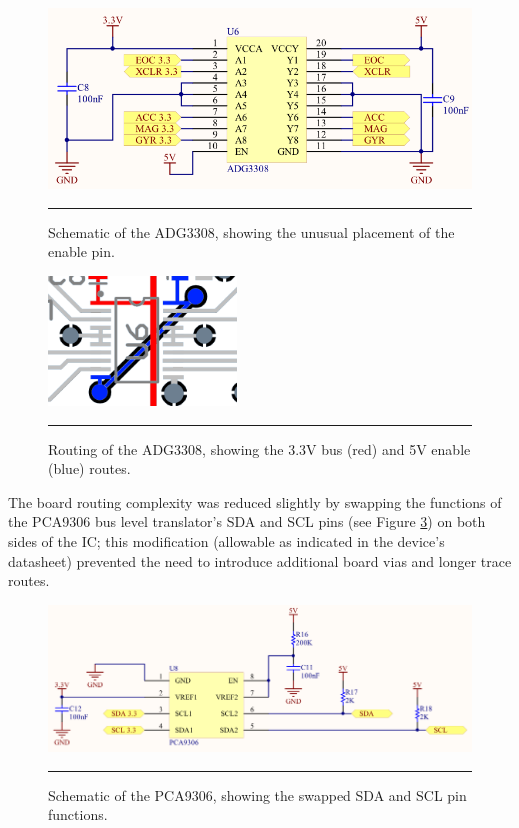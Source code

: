 \begin{figure}[tbph]
	\centering
		\includegraphics[width=120mm]{./Figures/LevelTranslatorSchematic.png}
	\rule{35em}{0.5pt}
	\caption[Bidirectional Level Translator Schematic]{Schematic of the ADG3308, showing the unusual placement of the enable pin.}
	\label{fig:ADG3308schematic}
\end{figure}

\begin{figure}[tbph]
	\centering
		\includegraphics[width=50mm]{./Figures/LevelConverterRouting.png}
	\rule{35em}{0.5pt}
	\caption[Bidirectional Level Translator Routing]{Routing of the ADG3308, showing the 3.3V bus (red) and 5V enable (blue) routes.}
	\label{fig:ADG3308routing}
\end{figure}

The board routing complexity was reduced slightly by swapping the functions of the PCA9306 bus level translator's SDA and SCL pins (see Figure \ref{fig:PCA9306schematic}) on both sides of the IC; this modification (allowable as indicated in the device's datasheet) prevented the need to introduce additional board vias and longer trace routes.

\begin{figure}[tbph]
	\centering
		\includegraphics[width=150mm]{./Figures/I2CTranslatorSchematic.png}
	\rule{35em}{0.5pt}
	\caption[I\textsuperscript{2}C Level Translator Schematic]{Schematic of the PCA9306, showing the swapped SDA and SCL pin functions.}
	\label{fig:PCA9306schematic}
\end{figure}

